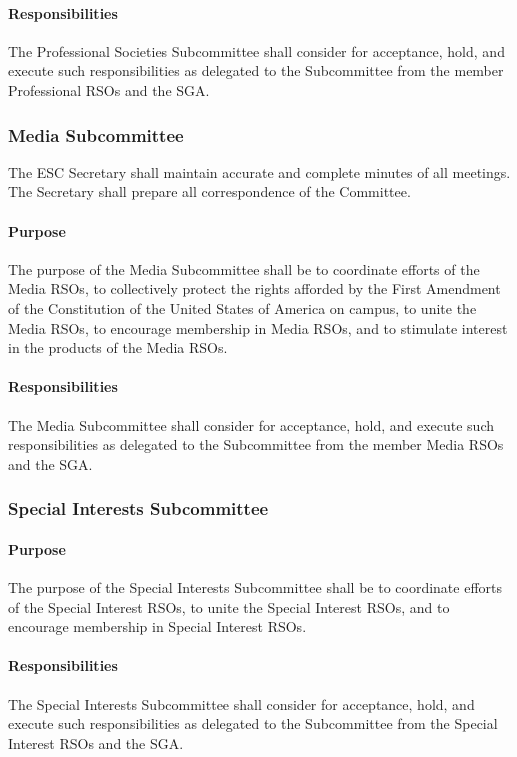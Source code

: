 \documentclass[12pt]{scrreprt}
\begin{document}
\paragraph{Responsibilities}
The Professional Societies Subcommittee shall consider for
acceptance, hold, and execute such responsibilities as delegated to the Subcommittee from
the member Professional RSOs and the SGA.

\subsubsection{Media Subcommittee}
The ESC Secretary shall maintain accurate and complete minutes of all
meetings. The Secretary shall prepare all correspondence of the Committee.

\paragraph{Purpose}
​The purpose of the Media Subcommittee shall be to coordinate efforts of the
Media RSOs, to collectively protect the rights afforded by the First Amendment of the
Constitution of the United States of America on campus, to unite the Media RSOs, to
encourage membership in Media RSOs, and to stimulate interest in the products of the
Media RSOs.

\paragraph{Responsibilities}
​The Media Subcommittee shall consider for acceptance, hold, and
execute such responsibilities as delegated to the Subcommittee from the member Media
RSOs and the SGA.

\subsubsection{Special Interests Subcommittee}

\paragraph{Purpose}
The purpose of the Special Interests Subcommittee shall be to coordinate
efforts of the Special Interest RSOs, to unite the Special Interest RSOs, and to encourage
membership in Special Interest RSOs.

\paragraph{Responsibilities}
​The Special Interests Subcommittee shall consider for acceptance,
hold, and execute such responsibilities as delegated to the Subcommittee from the Special
Interest RSOs and the SGA.
\end{document}

